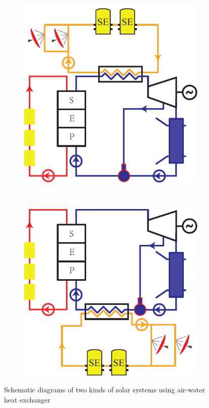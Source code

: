 \begin{figure}[htbp]
\centering
	\begin{subfigure}[b]{0.4\columnwidth}
	\includegraphics[width = \columnwidth]{fig/air-water1}
	\caption{}\label{fig:air-water_1_c}
	\end{subfigure}
	~
\begin{subfigure}[b]{0.4\columnwidth}
	\includegraphics[width = \columnwidth]{fig/air-water2}
	\caption{}\label{fig:air-water_2_c}
	\end{subfigure}
	\caption{Schematic diagrams of two kinds of solar systems using air-water heat exchanger}
	\label{fig:air-water_c}
\end{figure}

